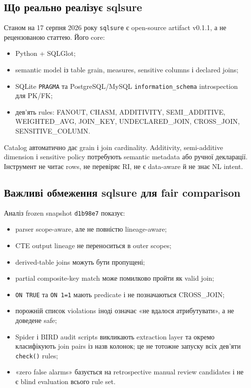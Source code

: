 \documentclass[11pt,a4paper]{article}
\begin{document}
\subsection{Що реально реалізує sqlsure}

Станом на 17 серпня 2026 року \texttt{sqlsure} є open-source artifact v0.1.1, а не
рецензованою статтею. Його core:

\begin{itemize}
\item Python + SQLGlot;
\item semantic model із table grain, measures, sensitive columns і declared joins;
\item SQLite \texttt{PRAGMA} та PostgreSQL/MySQL \texttt{information\_schema}
      introspection для PK/FK;
\item дев'ять rules: FANOUT, CHASM, ADDITIVITY, SEMI\_ADDITIVE, WEIGHTED\_AVG,
      JOIN\_KEY, UNDECLARED\_JOIN, CROSS\_JOIN, SENSITIVE\_COLUMN.
\end{itemize}

Catalog автоматично дає grain і join cardinality. Additivity, semi-additive dimension
і sensitive policy потребують semantic metadata або ручної декларації. Інструмент
не читає rows, не перевіряє RI, не є data-aware й не знає NL intent.

\subsection{Важливі обмеження sqlsure для fair comparison}

Аналіз frozen snapshot \texttt{d1b98e7} показує:

\begin{itemize}
\item parser scope-aware, але не повністю lineage-aware;
\item CTE output lineage не переноситься в outer scopes;
\item derived-table joins можуть бути пропущені;
\item partial composite-key match може помилково пройти як valid join;
\item \texttt{ON TRUE} та \texttt{ON 1=1} мають predicate і не позначаються CROSS\_JOIN;
\item порожній список violations іноді означає «не вдалося атрибутувати», а не
      доведене safe;
\item Spider і BIRD audit scripts викликають extraction layer та окремо класифікують
      join pairs із назв колонок; це не тотожне запуску всіх дев'яти \texttt{check()} rules;
\item «zero false alarms» базується на retrospective manual review candidates і
      не є blind evaluation всього rule set.
\end{itemize}
\end{document}
